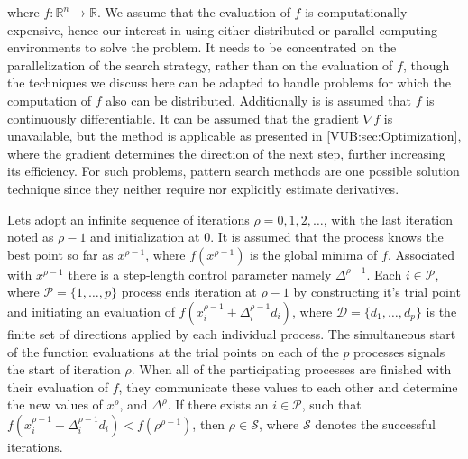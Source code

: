 		where $f:\mathbb{R}^n\longrightarrow\mathbb{R}$. We assume that the evaluation of $f$ is computationally expensive, hence our interest in using either distributed or parallel computing environments to solve the problem. It needs to be concentrated on the parallelization of the search strategy, rather than on the evaluation of $f$, though the techniques we discuss here can be adapted to handle problems for which the computation of $f$ also can be distributed. Additionally is is assumed that $f$ is continuously differentiable. It can be assumed that the gradient $\nabla f$ is unavailable, but the method is applicable as presented in \ref{VUB:sec:Optimization}, where the gradient determines the direction of the next step, further increasing its efficiency. For such problems, pattern search methods are one possible solution technique since they neither require nor explicitly estimate derivatives.\\


Lets adopt an infinite sequence of iterations $\rho=0,1,2,\dots$, with the last iteration noted as $\rho-1$ and initialization at $0$. It is assumed that the process knows the best point so far as $x^{\rho-1}$, where $f(x^{\rho-1})$ is the global minima of $f$. Associated with $x^{\rho-1}$ there is a step-length control parameter namely $\Delta^{\rho-1}$. Each $i\in\mathcal{P}$, where $\mathcal{P}=\{1,\dots,p\}$ process ends iteration at $\rho-1$ by constructing it's trial point and initiating an evaluation of $f(x^{\rho-1}_i+\Delta^{\rho-1}_id_i)$, where $\mathcal{D}=\{d_1,\dots,d_p\}$ is the finite set of directions applied by each individual process. The simultaneous start of the function evaluations at the trial points on each of the $p$ processes signals the start of iteration $\rho$. When all of the participating processes are finished with their evaluation of $f$, they communicate these values to each other and determine the new values of $x^\rho$, and $\Delta^\rho$. If there exists an $i\in\mathcal{P}$, such that $f(x^{\rho-1}_i+\Delta^{\rho-1}_id_i)<f(\rho^{\rho-1})$, then $\rho\in\mathcal{S}$, where $\mathcal{S}$ denotes the successful iterations.


